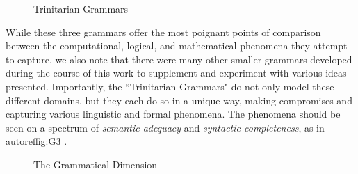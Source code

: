 \begin{figure}[H]
\centering
{}
\caption{Trinitarian Grammars} \label{fig:G2}
\end{figure}

While these three grammars offer the most poignant points of comparison between
the computational, logical, and mathematical phenomena they attempt to capture,
we also note that there were many other smaller grammars developed during the
course of this work to supplement and experiment with various ideas presented.
Importantly, the ``Trinitarian Grammars" do not only model these different
domains, but they each do so in a unique way, making compromises and capturing
various linguistic and formal phenomena. The phenomena should be seen on a
spectrum of \emph{semantic adequacy} and \emph{syntactic completeness}, as in
autoref{fig:G3} .  


\begin{figure}[H]
\centering
{}
\caption{The Grammatical Dimension} \label{fig:G3}
\end{figure}

